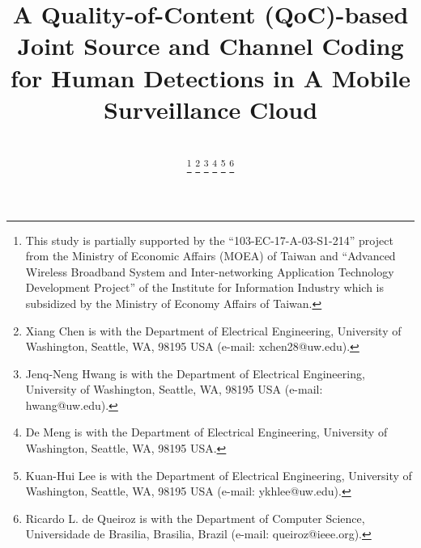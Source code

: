 \documentclass[journal]{IEEEtran}
\begin{document}
%
\title{A Quality-of-Content (QoC)-based Joint Source and Channel Coding for Human Detections in A Mobile Surveillance Cloud
}


\author{   \\
\thanks{This study is partially supported by the “103-EC-17-A-03-S1-214” project from the Ministry of Economic Affairs (MOEA) of Taiwan and “Advanced Wireless Broadband System and Inter-networking Application Technology Development Project” of the Institute for Information Industry which is subsidized by the Ministry of Economy Affairs of Taiwan.}
\thanks{Xiang Chen is with the Department
of Electrical Engineering, University of Washington, Seattle,
WA, 98195 USA (e-mail: xchen28@uw.edu).}%
\thanks{Jenq-Neng Hwang is with the Department
of Electrical Engineering, University of Washington, Seattle,
WA, 98195 USA (e-mail: hwang@uw.edu).}%
\thanks{De Meng is with the Department
of Electrical Engineering, University of Washington, Seattle,
WA, 98195 USA.}%
\thanks{Kuan-Hui Lee is with the Department
of Electrical Engineering, University of Washington, Seattle,
WA, 98195 USA (e-mail: ykhlee@uw.edu).}
\thanks{Ricardo L. de Queiroz is with the Department
of Computer Science, Universidade de Brasilia, Brasilia, Brazil (e-mail: queiroz@ieee.org).}

}

\maketitle
\end{document}
